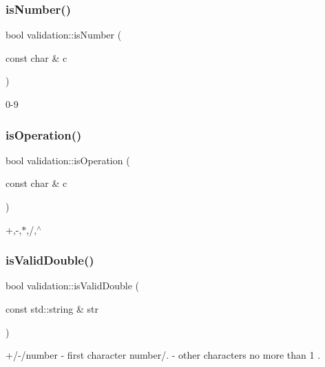 \subsubsection{\texorpdfstring{is\+Number()}{isNumber()}}
{\footnotesize\ttfamily bool validation\+::is\+Number (\begin{DoxyParamCaption}\item[{const char \&}]{c }\end{DoxyParamCaption})}

0-\/9 \mbox{\label{namespacevalidation_ac9fec2335861325c9e7c0c7b5a2f868d}} 
\subsubsection{\texorpdfstring{is\+Operation()}{isOperation()}}
{\footnotesize\ttfamily bool validation\+::is\+Operation (\begin{DoxyParamCaption}\item[{const char \&}]{c }\end{DoxyParamCaption})}

+,-\/,$\ast$,/,$^\wedge$ \mbox{\label{namespacevalidation_ac6510b1b11ad2a41bdacf9164db9171a}} 
\subsubsection{\texorpdfstring{is\+Valid\+Double()}{isValidDouble()}}
{\footnotesize\ttfamily bool validation\+::is\+Valid\+Double (\begin{DoxyParamCaption}\item[{const std\+::string \&}]{str }\end{DoxyParamCaption})}

+/-\//number -\/ first character number/\textquotesingle{}.\textquotesingle{} -\/ other characters no more than 1 \textquotesingle{}.\textquotesingle{} \mbox{\label{namespacevalidation_acc02b07e5822ad974d205771eddf50b5}} 
